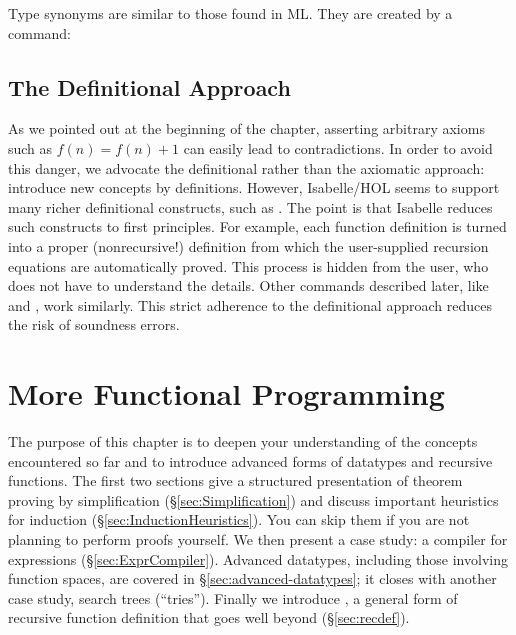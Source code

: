 %
Type synonyms are similar to those found in ML\@. They are created by a 
 command:






\section{The Definitional Approach}
\label{sec:definitional}

%
As we pointed out at the beginning of the chapter, asserting arbitrary
axioms such as $f(n) = f(n) + 1$ can easily lead to contradictions. In order
to avoid this danger, we advocate the definitional rather than
the axiomatic approach: introduce new concepts by definitions. However,  Isabelle/HOL seems to
support many richer definitional constructs, such as
. The point is that Isabelle reduces such constructs to first principles. For example, each
 function definition is turned into a proper
(nonrecursive!) definition from which the user-supplied recursion equations are
automatically proved.  This process is
hidden from the user, who does not have to understand the details.  Other commands described
later, like  and , work similarly.  
This strict adherence to the definitional approach reduces the risk of 
soundness errors.

\chapter{More Functional Programming}

The purpose of this chapter is to deepen your understanding of the
concepts encountered so far and to introduce advanced forms of datatypes and
recursive functions. The first two sections give a structured presentation of
theorem proving by simplification ({\S}\ref{sec:Simplification}) and discuss
important heuristics for induction ({\S}\ref{sec:InductionHeuristics}).  You can
skip them if you are not planning to perform proofs yourself.
We then present a case
study: a compiler for expressions ({\S}\ref{sec:ExprCompiler}). Advanced
datatypes, including those involving function spaces, are covered in
{\S}\ref{sec:advanced-datatypes}; it closes with another case study, search
trees (``tries'').  Finally we introduce , a general
form of recursive function definition that goes well beyond 
 ({\S}\ref{sec:recdef}).


